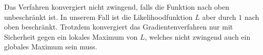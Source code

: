 Das Verfahren konvergiert nicht zwingend, falls die Funktion nach oben unbeschränkt ist. In unserem Fall ist die Likelihoodfunktion $L$ aber durch $1$ nach oben beschränkt. Trotzdem konvergiert das Gradientenverfahren nur mit Sicherheit gegen ein lokales Maximum von $L$, welches nicht zwingend auch ein globales Maximum sein muss.
